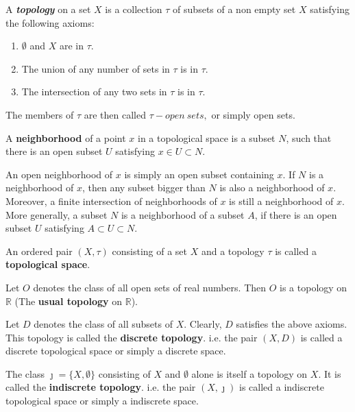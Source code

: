 \begin{definition}
A \textit{\textbf{topology}} on a set $X$ is a collection $\tau$ of subsets of a non empty set $X$ satisfying the following axioms:
\begin{enumerate}
  \item $\emptyset$ and $X$ are in $\tau$.
  \item The union of any number of sets in $\tau$ is in $\tau$.
  \item The intersection of any two sets in $\tau$ is in $\tau$.
\end{enumerate}
The members of $\tau$ are then called $\tau - open~sets,$ or simply open sets.
\end{definition}

\begin{definition}
A \textbf{neighborhood} of a point $x$ in a topological space is a subset $N$, such that there is an open subset $U$ satisfying $x\in U\subset N$.
\end{definition}
An open neighborhood of $x$ is simply an open subset containing $x$. If $N$ is a neighborhood of $x$, then any subset bigger than $N$ is also a neighborhood of $x$. Moreover, a finite intersection of neighborhoods of $x$ is still a neighborhood of $x$. More generally, a subset $N$ is a neighborhood of a subset $A$, if there is an
open subset $U$ satisfying $A\subset U\subset N$.

\begin{definition}
An ordered pair $(X,\tau)$ consisting of a set $X$ and a topology $\tau$ is called a \textbf{topological space}.
\end{definition}


\begin{example}\label{example1}
Let $O$ denotes the class of all open sets of real numbers. Then $O$ is a topology on $\mathbb{R}$ (The \textbf{usual topology} on $\mathbb{R}$).
\end{example}



\begin{example}\label{example2}
Let $D$ denotes the class of all subsets of $X$. Clearly, $D$ satisfies the above axioms.
This topology is called the \textbf{discrete topology}. i.e. the pair $(X,D)$ is called a discrete topological space or simply a discrete space.
\end{example}

\begin{example}\label{example3}
The class $\jmath =\{X,\emptyset\}$ consisting of $X$ and $\emptyset$ alone is itself a topology on $X$. It is called the \textbf{indiscrete topology}. i.e. the pair $(X,\jmath)$ is called a indiscrete topological space or simply a indiscrete space.
\end{example}


